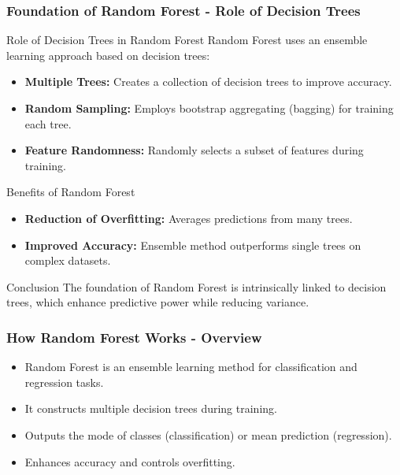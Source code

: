 \documentclass[aspectratio=169]{beamer}
\begin{document}
\begin{frame}[fragile]
    \frametitle{Foundation of Random Forest - Role of Decision Trees}
    \begin{block}{Role of Decision Trees in Random Forest}
        Random Forest uses an ensemble learning approach based on decision trees:
        \begin{itemize}
            \item \textbf{Multiple Trees:} Creates a collection of decision trees to improve accuracy.
            \item \textbf{Random Sampling:} Employs bootstrap aggregating (bagging) for training each tree.
            \item \textbf{Feature Randomness:} Randomly selects a subset of features during training.
        \end{itemize}
    \end{block}

    \begin{block}{Benefits of Random Forest}
        \begin{itemize}
            \item \textbf{Reduction of Overfitting:} Averages predictions from many trees.
            \item \textbf{Improved Accuracy:} Ensemble method outperforms single trees on complex datasets.
        \end{itemize}
    \end{block}
    
    \begin{block}{Conclusion}
        The foundation of Random Forest is intrinsically linked to decision trees, which enhance predictive power while reducing variance.
    \end{block}
\end{frame}

\begin{frame}[fragile]
    \frametitle{How Random Forest Works - Overview}
    \begin{itemize}
        \item Random Forest is an ensemble learning method for classification and regression tasks.
        \item It constructs multiple decision trees during training.
        \item Outputs the mode of classes (classification) or mean prediction (regression).
        \item Enhances accuracy and controls overfitting.
    \end{itemize}
\end{frame}
\end{document}
